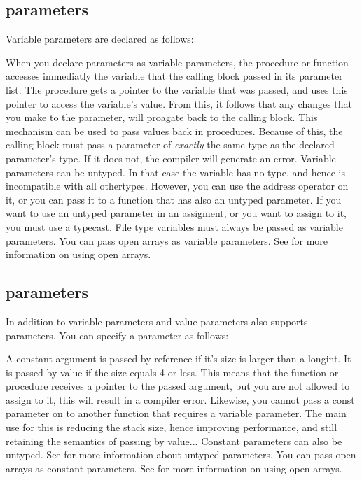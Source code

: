 \documentclass{report}
\begin{document}
\subsection{ parameters}
\label{se:varparams}
Variable parameters are declared as follows:

When you declare parameters as variable parameters, the procedure or
function accesses immediatly the variable that the calling block passed in
its parameter list. The procedure gets a pointer to the variable that was
passed, and uses this pointer to access the variable's value.
From this, it follows that any changes that you make to the parameter, will
proagate back to the calling block. This mechanism can be used to pass
values back in procedures.
Because of this, the calling block must pass a parameter of {\em exactly}
the same type as the declared parameter's type. If it does not, the compiler
will generate an error.
Variable parameters can be untyped. In that case the variable has no type,
and hence is incompatible with all othertypes. However, you can use the 
address operator on it, or you can pass it to a function that has also an 
untyped parameter. If you want to use an untyped parameter in an assigment,
or you want to assign to it, you must use a typecast.
File type variables must always be passed as variable parameters.
You can pass open arrays as variable parameters. See  for
more information on using open arrays.
\subsection{ parameters}
In addition to variable parameters and value parameters \fpc also supports 
 parameters. You can specify a  parameter as follows:

A constant argument is passed by reference if it's size is larger than a
longint. It is passed by value if the size equals 4 or less.
This means that the function or procedure receives a pointer to the passed 
argument, but you are not allowed to assign to it, this will result in a 
compiler error. Likewise, you cannot pass a const parameter on to another
function that requires a variable parameter.
The main use for this is reducing the stack size, hence improving
performance, and still retaining the semantics of passing by value...
Constant parameters can also be untyped. See  for more
information about untyped parameters.
You can pass open arrays as constant parameters. See  for
more information on using open arrays.
\end{document}
